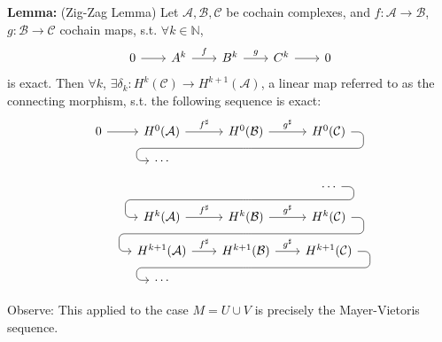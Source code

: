 \documentclass[10pt,letterpaper]{article}
\newcommand{\n}{\hfill\break}
\newcommand{\hangblock}[2]{\par\noindent\settowidth{\hangindent}{\textbf{#1: }}\textbf{#1: }\nolinebreak#2}
\newcommand{\lemma}[1]{\hangblock{Lemma}{#1}}
\newcommand{\naturals}{\mathbb{N}}
\newcommand{\N}{\naturals}
\newcommand{\st}{s.t.}
\begin{document}
\lemma{
	(Zig-Zag Lemma) Let $\mathcal{A},\mathcal{B},\mathcal{C}$ be cochain complexes, and $f:\mathcal{A}\to\mathcal{B}$, $g:\mathcal{B}\to\mathcal{C}$ cochain maps, \st{} $\forall{}k\in\N$,
	\[
		\begin{tikzcd}[ampersand replacement=\&, column sep=20pt]
			0 \arrow[r] \& A^{k} \arrow[r,"f"] \& B^{k} \arrow[r,"g"] \& C^{k} \arrow[r] \& 0
		\end{tikzcd}
	\]
	is exact. Then $\forall{}k$, $\exists\delta_{k}:H^{k}(\mathcal{C})\to{}H^{k+1}(\mathcal{A})$, a linear map referred to as the connecting morphism, \st{} the following sequence is exact:
	\[
		\begin{tikzcd}[ampersand replacement=\&, column sep=20pt, row sep=small]
			0 \arrow[r] \& H^{0}(\mathcal{A}) \arrow[r,"f^{\sharp}"] \& H^{0}(\mathcal{B}) \arrow[r,"g^{\sharp}"] \arrow[d, phantom, ""{coordinate, name=ref1}] \& H^{0}(\mathcal{C}) \arrow[dll, rounded corners, to path={
			-- ([xshift=10pt]\tikztostart.east)
			|- (ref1)
			-| ([xshift=-10pt]\tikztotarget.west)
			-- (\tikztotarget)
			}]\\
			\& \cdots \& \phantom{\cdots}\\
			\& \& \phantom{\cdots} \arrow[d,phantom,""{coordinate, name=ref2}] \& \cdots \arrow[dll, rounded corners, to path={
			-- ([xshift=10pt]\tikztostart.east)
			|- (ref2)
			-| ([xshift=-10pt]\tikztotarget.west)
			-- (\tikztotarget)
			}]\\
			\& H^{k}(\mathcal{A}) \arrow[r,"f^{\sharp}"] \& H^{k}(\mathcal{B}) \arrow[r,"g^{\sharp}"] \arrow[d,phantom,""{coordinate, name=ref3}] \& H^{k}(\mathcal{C}) \arrow[dll, rounded corners, to path={
			-- ([xshift=10pt]\tikztostart.east)
			|- (ref3)
			-| ([xshift=-10pt]\tikztotarget.west)
			-- (\tikztotarget)
			}]\\
			\& H^{k+1}(\mathcal{A}) \arrow[r,"f^{\sharp}"] \& H^{k+1}(\mathcal{B}) \arrow[r,"g^{\sharp}"] \arrow[d,phantom,""{coordinate, name=ref4}] \& H^{k+1}(\mathcal{C}) \arrow[dll, rounded corners, to path={
			-- ([xshift=10pt]\tikztostart.east)
			|- (ref4)
			-| ([xshift=-10pt]\tikztotarget.west)
			-- (\tikztotarget)
			}]\\
			\& \cdots \& \phantom{\cdots}
		\end{tikzcd}
	\]
}

\par\noindent
Observe: This applied to the case $M=U\cup{}V$ is precisely the Mayer-Vietoris sequence.\n
\end{document}
